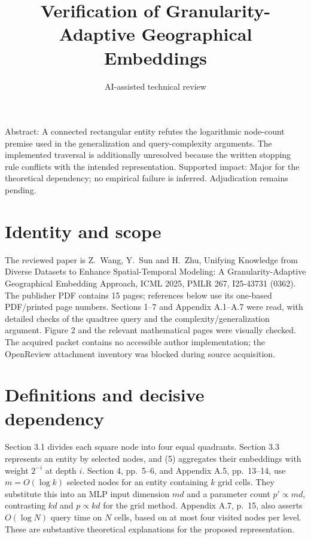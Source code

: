 \documentclass[10pt]{article}
\title{Verification of Granularity-Adaptive Geographical Embeddings}
\author{AI-assisted technical review}
\date{}
\begin{document}
\maketitle
Abstract: A connected rectangular entity refutes the logarithmic node-count premise used in the generalization and query-complexity arguments. The implemented traversal is additionally unresolved because the written stopping rule conflicts with the intended representation. Supported impact: Major for the theoretical dependency; no empirical failure is inferred. Adjudication remains pending.\par
\section*{Identity and scope}
The reviewed paper is Z. Wang, Y. Sun and H. Zhu, Unifying Knowledge from Diverse Datasets to Enhance Spatial-Temporal Modeling: A Granularity-Adaptive Geographical Embedding Approach, ICML 2025, PMLR 267, I25-43731 (0362). The publisher PDF contains 15 pages; references below use its one-based PDF/printed page numbers. Sections 1–7 and Appendix A.1–A.7 were read, with detailed checks of the quadtree query and the complexity/generalization argument. Figure 2 and the relevant mathematical pages were visually checked. The acquired packet contains no accessible author implementation; the OpenReview attachment inventory was blocked during source acquisition.\par
\section*{Definitions and decisive dependency}
Section 3.1 divides each square node into four equal quadrants. Section 3.3 represents an entity by selected nodes, and (5) aggregates their embeddings with weight \(2^{-i}\) at depth \(i\). Section 4, pp. 5–6, and Appendix A.5, pp. 13–14, use \(m=O(\log k)\) selected nodes for an entity containing \(k\) grid cells. They substitute this into an MLP input dimension \(md\) and a parameter count \(p'\propto md\), contrasting \(kd\) and \(p\propto kd\) for the grid method. Appendix A.7, p. 15, also asserts \(O(\log N)\) query time on \(N\) cells, based on at most four visited nodes per level. These are substantive theoretical explanations for the proposed representation.\par
\end{document}
